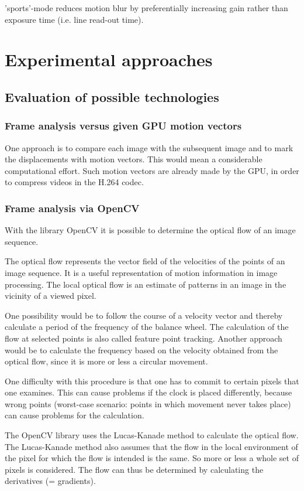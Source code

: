 \documentclass[12pt, a4paper]{report}
\begin{document}
'sports'-mode reduces motion blur by preferentially increasing gain rather than exposure time (i.e. line read-out time).

\chapter {Experimental approaches}

\section {Evaluation of possible technologies}
\subsection{Frame analysis versus given GPU motion vectors}
One approach is to compare each image with the subsequent image and to mark the displacements with motion vectors. This would mean a considerable computational effort.
Such motion vectors are already made by the GPU, in order to compress videos in the H.264 codec.

\subsection{Frame analysis via OpenCV}
With the library OpenCV it is possible to determine the optical flow of an image sequence. 

The optical flow represents the vector field of the velocities of the points of an image sequence. It is a useful representation of motion information in image processing. The local optical flow is an estimate of patterns in an image in the vicinity of a viewed pixel. 

One possibility would be to follow the course of a velocity vector and thereby calculate a period of the frequency of the balance wheel. The calculation of the flow at selected points is also called feature point tracking. Another approach would be to calculate the frequency based on the velocity obtained from the optical flow, since it is more or less a circular movement. 

One difficulty with this procedure is that one has to commit to certain pixels that one examines. This can cause problems if the clock is placed differently, because wrong points (worst-case scenario: points in which movement never takes place) can cause problems for the calculation.  

The OpenCV library uses the Lucas-Kanade method to calculate the optical flow. The Lucas-Kanade method also assumes that the flow in the local environment of the pixel for which the flow is intended is the same. So more or less a whole set of pixels is considered. The flow can thus be determined by calculating the derivatives (= gradients). 
\end{document}
